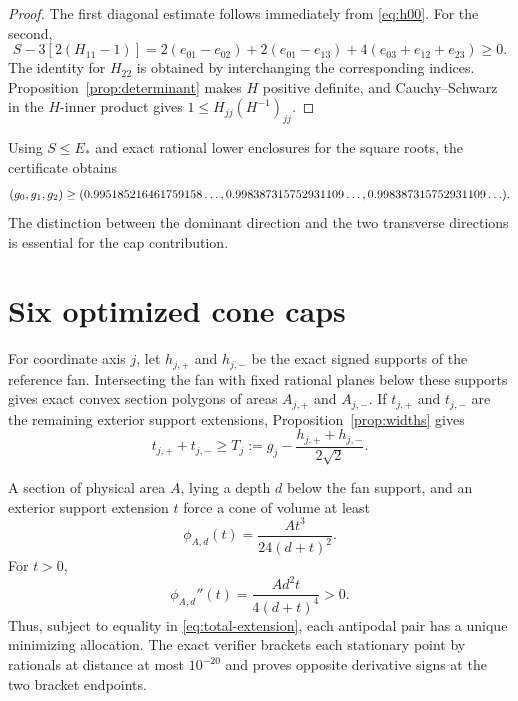 \documentclass[11pt,reqno]{amsart}
\theoremstyle{remark}
\begin{document}
\begin{proof}
The first diagonal estimate follows immediately from \eqref{eq:h00}.  For the
second,
\[
 S-3[2(H_{11}-1)]
 =2(e_{01}-e_{02})+2(e_{01}-e_{13})
  +4(e_{03}+e_{12}+e_{23})\ge0.
\]
The identity for $H_{22}$ is obtained by interchanging the corresponding
indices.  Proposition~\ref{prop:determinant} makes $H$ positive definite, and
Cauchy--Schwarz in the $H$-inner product gives
$1\le H_{jj}(H^{-1})_{jj}$.
\end{proof}

Using $S\le E_*$ and exact rational lower enclosures for the square roots, the
certificate obtains
\[
 (g_0,g_1,g_2)\ge
 (0.995185216461759158\ldots,0.998387315752931109\ldots,0.998387315752931109\ldots).
\]
The distinction between the dominant direction and the two transverse
directions is essential for the cap contribution.

\section{Six optimized cone caps}
\label{sec:caps}

For coordinate axis $j$, let $h_{j,+}$ and $h_{j,-}$ be the exact signed
supports of the reference fan.  Intersecting the fan with fixed rational planes
below these supports gives exact convex section polygons of areas
$A_{j,+}$ and $A_{j,-}$.  If $t_{j,+}$ and $t_{j,-}$ are the remaining exterior
support extensions, Proposition~\ref{prop:widths} gives
\begin{equation}\label{eq:total-extension}
 t_{j,+}+t_{j,-}\ge
 T_j:=g_j-\frac{h_{j,+}+h_{j,-}}{2\sqrt2}.
\end{equation}

A section of physical area $A$, lying a depth $d$ below the fan support, and
an exterior support extension $t$ force a cone of volume at least
\begin{equation}\label{eq:cap-profile}
 \phi_{A,d}(t)=\frac{At^3}{24(d+t)^2}.
\end{equation}
For $t>0$,
\[
 \phi_{A,d}''(t)=\frac{Ad^2t}{4(d+t)^4}>0.
\]
Thus, subject to equality in \eqref{eq:total-extension}, each antipodal pair
has a unique minimizing allocation.  The exact verifier brackets each
stationary point by rationals at distance at most $10^{-20}$ and proves
opposite derivative signs at the two bracket endpoints.
\end{document}
